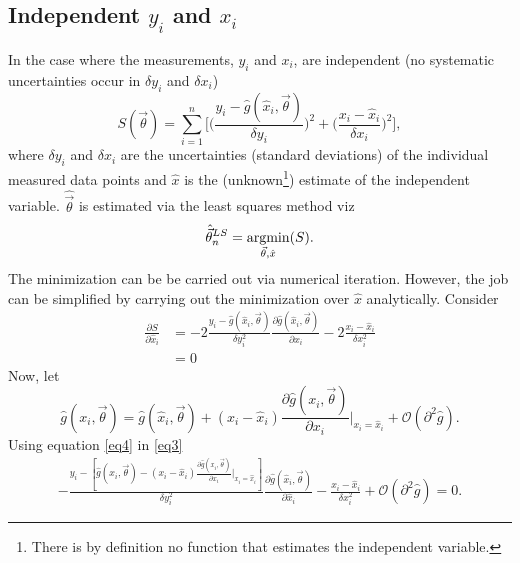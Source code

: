 \subsection{Independent $y_i$ and $x_i$} In the case where the measurements, $y_i$ and $x_i$, are independent (no systematic uncertainties occur in $\delta y_i$ and $\delta x_i$)
\begin{equation}
	S(\vec{\theta})=\sum_{i=1}^n\bigg[\bigg(\frac{y_i-\hat{g}(\hat{x}_i,\vec{\theta})}{\delta y_i}\bigg)^2+\bigg(\frac{x_i-\hat{x}_i}{\delta x_i}\bigg)^2\bigg],
	\label{eq6}
\end{equation}
where $\delta y_i$ and $\delta x_i$ are the uncertainties (standard deviations) of the individual measured data points and $\hat{x}$ is the (unknown\footnote{There is by definition no function that estimates the independent variable.}) estimate of the independent variable. $\hat{\vec{\theta}}$ is estimated via the least squares method viz
\begin{equation}
	\hat{\vec{ \theta}}_n^{LS}=\operatorname*{argmin}_{\vec{\theta},\hat{x}}(S).
\end{equation}
The minimization can be be carried out via numerical iteration. However, the job can be simplified by carrying out the minimization over $\hat{x}$ analytically. Consider
\begin{equation}
	\begin{split}
		\frac{\partial S}{\partial \hat{x}_i}&=-2\frac{y_i-\hat{g}(\hat{x}_i,\vec{\theta})}{\delta y_i^2}\frac{\partial \hat{g}(\hat{x}_i,\vec{\theta})}{\partial \hat{x}_i}-2\frac{x_i-\hat{x}_i}{\delta x_i^2}\\
		&=0
	\end{split}
	\label{eq3}
\end{equation}
Now, let
\begin{equation}
	\hat{g}(x_i,\vec{\theta})=\hat{g}(\hat{x}_i,\vec{\theta})+(x_i-\hat{x}_i)\frac{\partial \hat{g}(x_i,\vec{\theta})}{\partial x_i}\bigg|_{x_i=\hat{x}_i}+\mathcal{O}(\partial^2\hat{g}).
	\label{eq4}
\end{equation}
Using equation \eqref{eq4} in \eqref{eq3}
\begin{equation}
	\begin{split}
		-\frac{y_i-[\hat{g}(x_i,\vec{\theta})-(x_i-\hat{x}_i)\frac{\partial \hat{g}(x_i,\vec{\theta})}{\partial x_i}\bigg|_{x_i=\hat{x}_i}]}{\delta y_i^2}\frac{\partial \hat{g}(\hat{x}_i,\vec{\theta})}{\partial \hat{x}_i}-\frac{x_i-\hat{x}_i}{\delta x_i^2}+\mathcal{O}(\partial^2\hat{g})=0.
	\end{split}
\end{equation}
